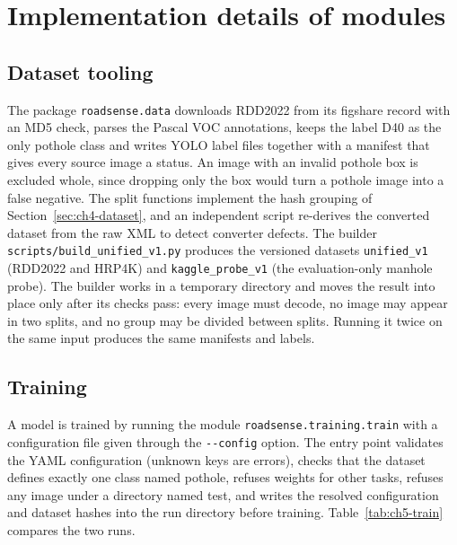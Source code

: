 \section{Implementation details of modules}\label{sec:ch5-modules}

\subsection{Dataset tooling}\label{sec:ch5-datatools}
The package \texttt{roadsense.data} downloads RDD2022 from its figshare record with an MD5 check, parses the Pascal VOC annotations, keeps the label D40 as the only pothole class and writes YOLO label files together with a manifest that gives every source image a status. An image with an invalid pothole box is excluded whole, since dropping only the box would turn a pothole image into a false negative. The split functions implement the hash grouping of Section~\ref{sec:ch4-dataset}, and an independent script re-derives the converted dataset from the raw XML to detect converter defects. The builder \texttt{scripts/build\_unified\_v1.py} produces the versioned datasets \texttt{unified\_v1} (RDD2022 and HRP4K) and \texttt{kaggle\_probe\_v1} (the evaluation-only manhole probe). The builder works in a temporary directory and moves the result into place only after its checks pass: every image must decode, no image may appear in two splits, and no group may be divided between splits. Running it twice on the same input produces the same manifests and labels.

\subsection{Training}\label{sec:ch5-training}
A model is trained by running the module \texttt{roadsense.training.train} with a configuration file given through the \texttt{-{}-config} option. The entry point validates the YAML configuration (unknown keys are errors), checks that the dataset defines exactly one class named pothole, refuses weights for other tasks, refuses any image under a directory named test, and writes the resolved configuration and dataset hashes into the run directory before training. Table~\ref{tab:ch5-train} compares the two runs.

